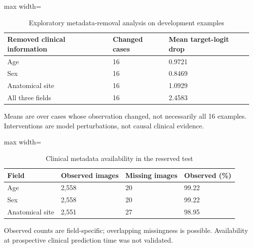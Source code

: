 \begin{table}[t]
\centering
\small
\caption{Exploratory metadata-removal analysis on development examples}
\label{tab:11-xai-metadata}
\begin{adjustbox}{max width=\textwidth}
\begin{tabular}{lll}
\toprule
\textbf{Removed clinical information} & \textbf{Changed cases} & \textbf{Mean target-logit drop} \\
\midrule
Age & 16 & 0.9721 \\
Sex & 16 & 0.8469 \\
Anatomical site & 16 & 1.0929 \\
All three fields & 16 & 2.4583 \\
\bottomrule
\end{tabular}
\end{adjustbox}
\par\smallskip
\begin{minipage}{\textwidth}\footnotesize Means are over cases whose observation changed, not necessarily all 16 examples. Interventions are model perturbations, not causal clinical evidence.\end{minipage}
\end{table}

\begin{table}[t]
\centering
\small
\caption{Clinical metadata availability in the reserved test}
\label{tab:12-metadata-coverage}
\begin{adjustbox}{max width=\textwidth}
\begin{tabular}{llll}
\toprule
\textbf{Field} & \textbf{Observed images} & \textbf{Missing images} & \textbf{Observed (\%)} \\
\midrule
Age & 2,558 & 20 & 99.22 \\
Sex & 2,558 & 20 & 99.22 \\
Anatomical site & 2,551 & 27 & 98.95 \\
\bottomrule
\end{tabular}
\end{adjustbox}
\par\smallskip
\begin{minipage}{\textwidth}\footnotesize Observed counts are field-specific; overlapping missingness is possible. Availability at prospective clinical prediction time was not validated.\end{minipage}
\end{table}

